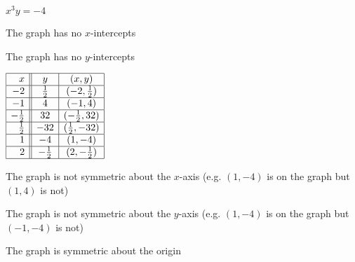 {$x^{3}y = -4$}
{
The graph has no $x$-intercepts \smallskip

The graph has no $y$-intercepts \smallskip

$\begin{array}{|r||c|c|}  

\hline
           x &            y & (x,y) \\ \hline
          -2 &  \frac{1}{2} & (-2, \frac{1}{2}) \\  \hline
          -1 &            4 & (-1, 4) \\ \hline
-\frac{1}{2} &           32 & (-\frac{1}{2}, 32) \\ \hline
 \frac{1}{2} &          -32 & (\frac{1}{2}, -32)\\ \hline
           1 &           -4 & (1, -4) \\ \hline
           2 & -\frac{1}{2} & (2, -\frac{1}{2}) \\ \hline
 
\end{array} $ \smallskip


\smallskip

The graph is not symmetric about the $x$-axis (e.g. $(1, -4)$ is on the graph but $(1, 4)$ is not) \smallskip

The graph is not symmetric about the $y$-axis (e.g. $(1, -4)$ is on the graph but $(-1, -4)$ is not)\smallskip

The graph is symmetric about the origin}